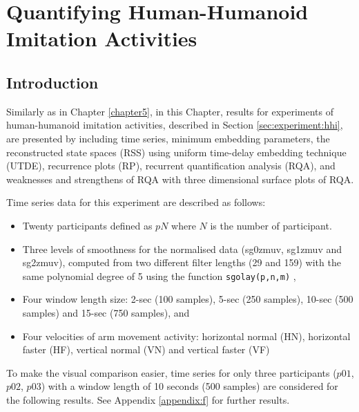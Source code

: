 
\chapter{Quantifying Human-Humanoid Imitation Activities} \label{chapter6}

\graphicspath{{figs/chapter6/PDF/}}

\section{Introduction} 
Similarly as in Chapter \ref{chapter5}, in this Chapter, 
results for experiments of human-humanoid imitation activities, 
described in Section \ref{sec:experiment:hhi},  
are presented by including time series, minimum embedding parameters, 
the reconstructed state spaces (RSS) using 
uniform time-delay embedding technique (UTDE), 
recurrence plots (RP),
recurrent quantification analysis (RQA), and 
weaknesses and strengthens of RQA with 
three dimensional surface plots of RQA. 

Time series data for this experiment are described as follows:
\begin{itemize}

\item Twenty participants defined as $pN$ where $N$ is the number of 
	participant.

\item Three levels of smoothness for the normalised data 
(sg0zmuv, sg1zmuv and sg2zmuv), computed from two different filter 
lengths (29 and 159) with the same polynomial degree of 5 using the 
function \texttt{sgolay(p,n,m)} \citep{Rsignal},

\item Four window length size: 2-sec (100 samples), 5-sec (250 samples), 
	10-sec (500 samples) and 15-sec (750 samples), and 

\item Four velocities of arm movement activity: horizontal normal (HN), 
	horizontal faster (HF), vertical normal (VN) and 
	vertical faster (VF)
\end{itemize}
To make the visual comparison easier, time series for only 
three participants ($p01$, $p02$, $p03$) with a window length 
of 10 seconds (500 samples) are considered for the following results.
See Appendix \ref{appendix:f} for further results.

